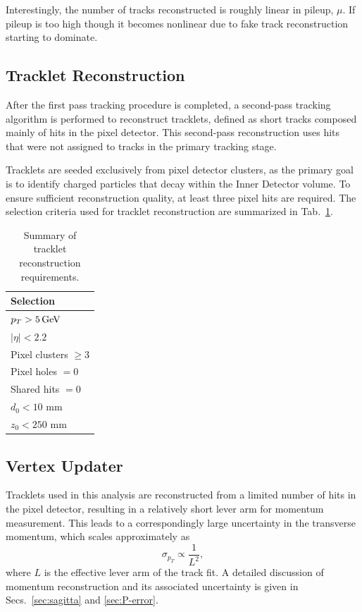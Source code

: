 Interestingly, the number of tracks reconstructed is roughly linear in pileup, $\mu$. If pileup is too high though it becomes nonlinear due to fake track reconstruction starting to dominate. 


\subsection{Tracklet Reconstruction}

After the first pass tracking procedure is completed, a second-pass tracking algorithm is performed to reconstruct tracklets, defined as short tracks composed mainly of hits in the pixel detector. This second-pass reconstruction uses hits that were not assigned to tracks in the primary tracking stage.

Tracklets are seeded exclusively from pixel detector clusters, as the primary goal is to identify charged particles that decay within the Inner Detector volume. To ensure sufficient reconstruction quality, at least three pixel hits are required. The selection criteria used for tracklet reconstruction are summarized in Tab.~\ref{tab:tracklet_reco}.

\begin{table}[ht!]
\centering
	\begin{tabular}{l}
      \hline
	  Selection\\
	  \hline \hline
	  $p_T > 5\,\text{GeV}$ \\
	  $|\eta| < 2.2$ \\
	  Pixel clusters $\geq 3$ \\
	  Pixel holes $= 0$ \\
	  Shared hits $= 0$ \\
	  $d_0 < 10$ mm \\
	  $z_0 < 250$ mm \\

	\end{tabular}
    \caption{Summary of tracklet reconstruction requirements.}
    \label{tab:tracklet_reco}
\end{table}


\subsection{Vertex Updater}
\label{sec:KVU}

Tracklets used in this analysis are reconstructed from a limited number of hits in the pixel detector, resulting in a relatively short lever arm for momentum measurement. This leads to a correspondingly large uncertainty in the transverse momentum, which scales approximately as
\[
\sigma_{p_T} \propto \frac{1}{L^2},
\]
where \(L\) is the effective lever arm of the track fit. A detailed discussion of momentum reconstruction and its associated uncertainty is given in Secs.~\ref{sec:sagitta} and \ref{sec:P-error}.

